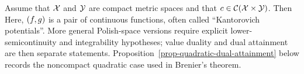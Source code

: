 \begin{prop}\label{prop-kantorovich-duality-general}
	Assume that $\mathcal{X}$ and $\mathcal{Y}$ are compact metric spaces and that $c\in\mathcal{C}(\mathcal{X}\times\mathcal{Y})$. Then
	Here, $(f,g)$ is a pair of continuous functions, often called ``Kantorovich potentials''.
	More general Polish-space versions require explicit lower-semicontinuity and integrability hypotheses; value duality and dual attainment are then separate statements. Proposition~\ref{prop-quadratic-dual-attainment} below records the noncompact quadratic case used in Brenier's theorem.
\end{prop}
